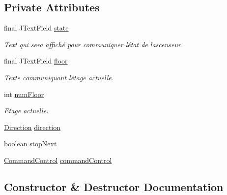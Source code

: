 \subsection*{Private Attributes}
\begin{DoxyCompactItemize}
\item 
final J\+Text\+Field \mbox{\hyperlink{classcontrol_1_1_simulation_operational_a00a11786ca7a99c8e6ee6b3990300ac6}{state}}
\begin{DoxyCompactList}\small\item\em Text qui sera affiché pour communiquer l\textquotesingle{}état de l\textquotesingle{}ascenseur. \end{DoxyCompactList}\item 
final J\+Text\+Field \mbox{\hyperlink{classcontrol_1_1_simulation_operational_a0b981ca8176d219f57d95af4f780699d}{floor}}
\begin{DoxyCompactList}\small\item\em Texte communiquant l\textquotesingle{}étage actuelle. \end{DoxyCompactList}\item 
int \mbox{\hyperlink{classcontrol_1_1_simulation_operational_a8b244e8cd89afb3060e4025c76f3ccc1}{num\+Floor}}
\begin{DoxyCompactList}\small\item\em Etage actuelle. \end{DoxyCompactList}\item 
\mbox{\hyperlink{enumcontrol_1_1command_1_1_direction}{Direction}} \mbox{\hyperlink{classcontrol_1_1_simulation_operational_acd8854111b611282faba5ff24d894b53}{direction}}
\item 
boolean \mbox{\hyperlink{classcontrol_1_1_simulation_operational_acda8346b0a85916ca536b13bcb704b33}{stop\+Next}}
\item 
\mbox{\hyperlink{interfacecontrol_1_1_command_control}{Command\+Control}} \mbox{\hyperlink{classcontrol_1_1_simulation_operational_a381628f543ab9b586023f718af9a279d}{command\+Control}}
\end{DoxyCompactItemize}


\subsection{Constructor \& Destructor Documentation}
\mbox{\label{classcontrol_1_1_simulation_operational_a05ea4626f887de31e4c40b3ff2e52162}} 
